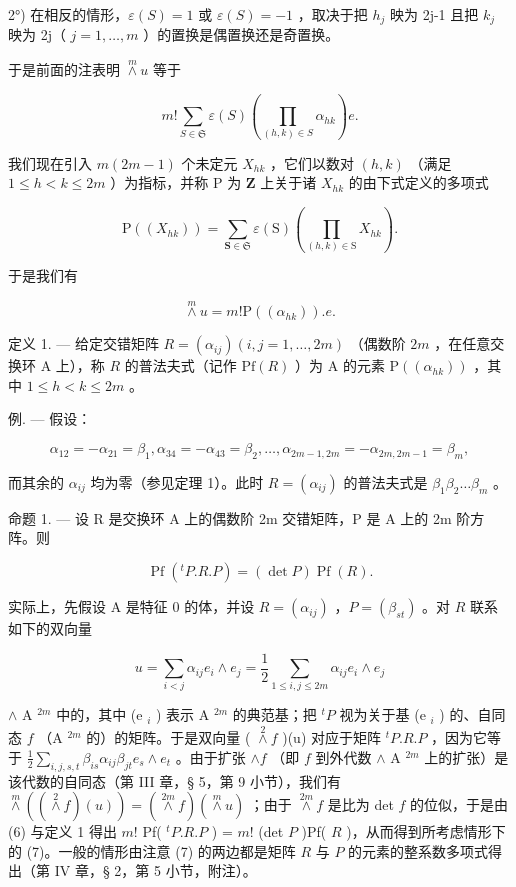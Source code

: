 2°) 在相反的情形，\(\varepsilon(S)=1\) 或 \(\varepsilon(S)=-1\) ，取决于把 \(h_{j}\) 映为 2j-1 且把 \(k_{j}\) 映为 2j（ \(j=1,\ldots,m\) ）的置换是偶置换还是奇置换。

于是前面的注表明 \(\overset{m}{\wedge} u\) 等于

\[
m! \sum_ {S \in \mathfrak {S}} \varepsilon (S) (\prod_ {(h, k) \in S} \alpha_ {h k}) e.\tag{4}
\]

我们现在引入 \(m(2m-1)\) 个未定元 \(X_{hk}\) ，它们以数对 \((h,k)\) （满足 \(1\leqslant h<k\leqslant2m\) ）为指标，并称 P 为 \(\mathbf{Z}\) 上关于诸 \(X_{hk}\) 的由下式定义的多项式

\[
\mathrm{P} ((X _ {h k})) = \sum_ {\mathbf {S} \in \mathfrak {S}} \varepsilon (\mathrm{S}) (\prod_ {(h, k) \in \mathrm{S}} X _ {h k}).\tag{5}
\]

于是我们有

\[
\stackrel {m} {\wedge} u = m! \mathrm{P} ((\alpha_ {h k})). e.\tag{6}
\]

定义 1. --- 给定交错矩阵 \(R = (\alpha_{ij}) (i, j = 1, \ldots, 2m)\) （偶数阶 \(2m\) ，在任意交换环 A 上），称 \(R\) 的普法夫式（记作 \(\mathrm{Pf}(R)\) ）为 A 的元素 \(\mathrm{P}((\alpha_{hk}))\) ，其中 \(1 \leqslant h < k \leqslant 2m\) 。

例. --- 假设：

\[
\alpha_ {1 2} = - \alpha_ {2 1} = \beta_ {1}, \alpha_ {3 4} = - \alpha_ {4 3} = \beta_ {2}, \dots , \alpha_ {2 m - 1, 2 m} = - \alpha_ {2 m, 2 m - 1} = \beta_ {m},
\]

而其余的 \(\alpha_{ij}\) 均为零（参见定理 1）。此时 \(R = (\alpha_{ij})\) 的普法夫式是 \(\beta_1\beta_2\ldots\beta_m\) 。

命题 1. --- 设 R 是交换环 A 上的偶数阶 2m 交错矩阵，P 是 A 上的 2m 阶方阵。则

\[
\operatorname{Pf} (^ {t} P. R. P) = (\det P) \operatorname{Pf} (R).\tag{7}
\]

实际上，先假设 A 是特征 0 的体，并设 \(R = (\alpha_{ij})\) ，\(P = (\beta_{st})\) 。对 \(R\) 联系如下的双向量

\[
u = \sum_ {i <   j} \alpha_ {i j} e _ {i} \wedge e _ {j} = \frac {1}{2} \sum_ {1 \leqslant i, j \leqslant 2 m} \alpha_ {i j} e _ {i} \wedge e _ {j}
\]

\(\wedge\) A \(^{2m}\) 中的，其中 (e \(_i\) ) 表示 A \(^{2m}\) 的典范基；把 \(^t P\) 视为关于基 (e \(_i\) ) 的、自同态 \(f\) （A \(^{2m}\) 的）的矩阵。于是双向量 ( \(\overset{2}{\wedge} f\) )(u) 对应于矩阵 \(^t P.R.P\) ，因为它等于 \(\frac{1}{2}\sum_{i,j,s,t}\beta_{is}\alpha_{ij}\beta_{jt}e_s\wedge e_t\) 。由于扩张 \(\wedge f\) （即 \(f\) 到外代数 \(\wedge\) A \(^{2m}\) 上的扩张）是该代数的自同态（第 III 章，§ 5，第 9 小节），我们有 \(\overset{m}{\wedge}((\overset{2}{\wedge}f)(u)) = (\overset{2m}{\wedge}f)(\overset{m}{\wedge}u)\) ；由于 \(\overset{2m}{\wedge} f\) 是比为 det \(f\) 的位似，于是由 (6) 与定义 1 得出 \(m!\) Pf( \(^t P.R.P\) ) = \(m!\) (det \(P\) )Pf( \(R\) )，从而得到所考虑情形下的 (7)。一般的情形由注意 (7) 的两边都是矩阵 \(R\) 与 \(P\) 的元素的整系数多项式得出（第 IV 章，§ 2，第 5 小节，附注）。

